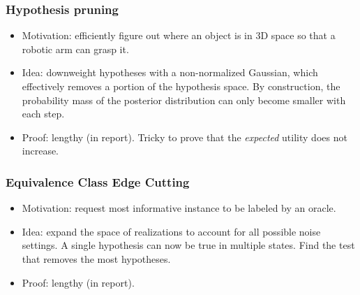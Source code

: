 \documentclass[handout]{beamer}
\begin{document}
\begin{frame}\frametitle{Hypothesis pruning}
\begin{itemize}
    \item Motivation: efficiently figure out where an object is in 3D space so that a robotic arm can grasp it.
    \pause
    \item Idea: downweight hypotheses with a non-normalized Gaussian, which effectively removes a portion of the hypothesis space. By construction, the probability mass of the posterior distribution can only become smaller with each step.
    \item Proof: lengthy (in report). Tricky to prove that the \emph{expected} utility does not increase.
\end{itemize}
\end{frame}

\begin{frame}\frametitle{Equivalence Class Edge Cutting}
\begin{itemize}
    \item Motivation: request most informative instance to be labeled by an oracle.
    \pause
    \item Idea: expand the space of realizations to account for all possible noise settings. A single hypothesis can now be true in multiple states. Find the test that removes the most hypotheses.
    \item Proof: lengthy (in report).
\end{itemize}
\end{frame}
\end{document}
